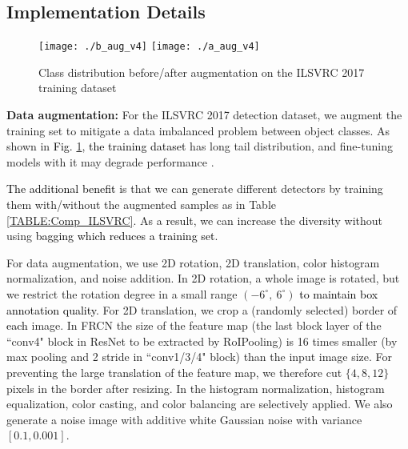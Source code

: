 \documentclass[10pt,twocolumn,letterpaper]{article}
\newcommand{\RE}{\textcolor{black}}
\newcommand{\RV}{\textcolor{black}}
\begin{document}
\subsection{Implementation Details}
\label{Exp:Details}
\begin{figure}[!tbp]
\texttt{[image: ./b\_aug\_v4]}
\texttt{[image: ./a\_aug\_v4]}
\caption{{Class distribution before/after augmentation on the  ILSVRC 2017 training dataset}}
\label{fig:Samp_dist}
\end{figure}





\textbf{Data augmentation:}
For the ILSVRC 2017 detection dataset, we augment the training set to mitigate a data imbalanced problem between object classes. As shown in \RE{Fig.} \ref{fig:Samp_dist}, \RV{the training dataset} has long tail distribution, and fine-tuning models with it may degrade performance \cite{longtail}. 

\RE{The additional  benefit} is that we can generate different detectors by training them with/without the augmented samples as in Table \ref{TABLE:Comp_ILSVRC}. As a result, we can increase the diversity without using \RE{bagging which reduces a  training set}.

For data augmentation, we use  2D rotation, 2D translation, color histogram normalization, and noise addition. In 2D rotation, a whole image is rotated, but we restrict the rotation degree in a small range $(-6^{\circ}, ~6^{\circ})$ \RE{to maintain box annotation quality}. For 2D translation, we crop a (randomly selected) border of \RE{each} image. In FRCN the size of the feature map (\eg the last block layer of the ``conv4" block in ResNet to be extracted by RoIPooling) is 16 times smaller (by max pooling and 2 stride in ``conv1/3/4" block) than the input image size. For preventing the large translation of the feature map, we therefore cut $\{4, 8, 12\}$ pixels in the border after resizing. In the histogram normalization, histogram equalization, color casting, and color balancing are selectively applied. We also generate a noise image with additive white Gaussian noise with variance $[0.1, 0.001]$. 
\end{document}
